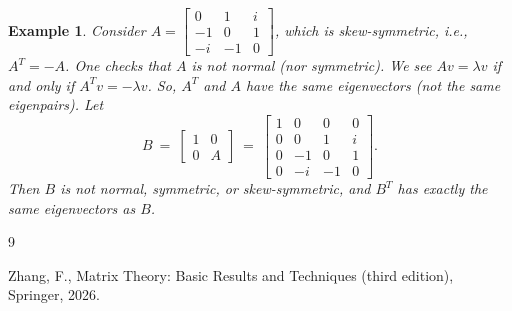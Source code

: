 \documentclass{article}
\newtheorem{exa}{Example}
\begin{document}
\begin{exa}
\rm Consider
$A=\begin{bmatrix}
0 & 1 & i \\
-1 & 0 & 1\\
-i & -1 &0
\end{bmatrix}$, which is skew-symmetric, i.e.,
$A^T=-A$.  One checks that
  $A$ is not normal (nor symmetric). %
We see
$Av=\lambda v$ if and only if $A^T v=-\lambda v$. So, $A^T$ and $A$ have the same eigenvectors (not the same eigenpairs). Let
$$B \ = \ \begin{bmatrix}
1 & 0 \\
0 & A
\end{bmatrix}\ = \ \begin{bmatrix}
1 & 0 & 0 & 0\\
0 & 0 & 1 & i \\
0 & -1 & 0 & 1\\
0 & -i & -1 &0
\end{bmatrix}.$$ Then $B$ is not normal, symmetric, or skew-symmetric, and $B^T$ has
exactly the same eigenvectors as $B$.
\end{exa}






\begin{thebibliography}{9}

{\sc Zhang, F.,}
Matrix Theory: Basic Results and Techniques (third edition), Springer, 2026.




\end{thebibliography}


\end{document}
